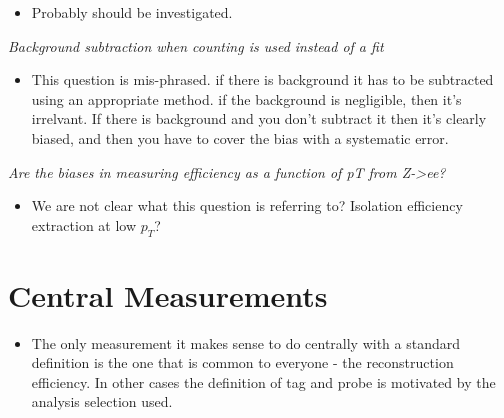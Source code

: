 \documentclass[11pt,a4paper]{article}
\begin{document}
\begin{itemize}
    \item Probably should be investigated.
\end{itemize}

{\it Background subtraction when counting is used instead of a fit} \\

\begin{itemize}    
    \item This question is mis-phrased. if there is background it has to be
subtracted using an appropriate method. if the background is negligible,
then it's irrelvant. If there is background and you don't subtract it
then it's clearly biased, and then you have to cover the bias with a systematic error.
\end{itemize}

{\it Are the biases in measuring efficiency as a function of pT from Z->ee?} \\

\begin{itemize}    
    \item We are not clear what this question is referring to?  Isolation efficiency
extraction at low $p_{T}$?
\end{itemize}

\section{Central Measurements}

\begin{itemize}
    \item The only measurement it makes sense to do centrally with a standard
definition is the one that is common to everyone - the reconstruction
efficiency.  In other cases the definition of tag and probe is motivated
by the analysis selection used.
\end{itemize}



\end{document}
